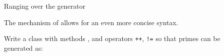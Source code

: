  {Ranging over the generator}


The  mechanism of
 allows for an even more concise
syntax.

\begin{exercise}
  \label{ex:primerange}
  Write a class  with methods ,  and
  operators \verb|++|, \verb+!=+ so that primes can be generated as:
\end{exercise}
